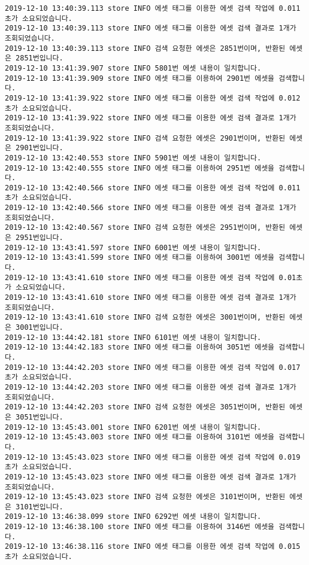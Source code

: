 \begin{Verbatim}[fontsize=\tiny, breaklines=true, breakanywhere=true]
2019-12-10 13:40:39.113 store INFO 에셋 태그를 이용한 에셋 검색 작업에 0.011초가 소요되었습니다.
2019-12-10 13:40:39.113 store INFO 에셋 태그를 이용한 에셋 검색 결과로 1개가 조회되었습니다.
2019-12-10 13:40:39.113 store INFO 검색 요청한 에셋은 2851번이며, 반환된 에셋은 2851번입니다.
2019-12-10 13:41:39.907 store INFO 5801번 에셋 내용이 일치합니다.
2019-12-10 13:41:39.909 store INFO 에셋 태그를 이용하여 2901번 에셋을 검색합니다.
2019-12-10 13:41:39.922 store INFO 에셋 태그를 이용한 에셋 검색 작업에 0.012초가 소요되었습니다.
2019-12-10 13:41:39.922 store INFO 에셋 태그를 이용한 에셋 검색 결과로 1개가 조회되었습니다.
2019-12-10 13:41:39.922 store INFO 검색 요청한 에셋은 2901번이며, 반환된 에셋은 2901번입니다.
2019-12-10 13:42:40.553 store INFO 5901번 에셋 내용이 일치합니다.
2019-12-10 13:42:40.555 store INFO 에셋 태그를 이용하여 2951번 에셋을 검색합니다.
2019-12-10 13:42:40.566 store INFO 에셋 태그를 이용한 에셋 검색 작업에 0.011초가 소요되었습니다.
2019-12-10 13:42:40.566 store INFO 에셋 태그를 이용한 에셋 검색 결과로 1개가 조회되었습니다.
2019-12-10 13:42:40.567 store INFO 검색 요청한 에셋은 2951번이며, 반환된 에셋은 2951번입니다.
2019-12-10 13:43:41.597 store INFO 6001번 에셋 내용이 일치합니다.
2019-12-10 13:43:41.599 store INFO 에셋 태그를 이용하여 3001번 에셋을 검색합니다.
2019-12-10 13:43:41.610 store INFO 에셋 태그를 이용한 에셋 검색 작업에 0.01초가 소요되었습니다.
2019-12-10 13:43:41.610 store INFO 에셋 태그를 이용한 에셋 검색 결과로 1개가 조회되었습니다.
2019-12-10 13:43:41.610 store INFO 검색 요청한 에셋은 3001번이며, 반환된 에셋은 3001번입니다.
2019-12-10 13:44:42.181 store INFO 6101번 에셋 내용이 일치합니다.
2019-12-10 13:44:42.183 store INFO 에셋 태그를 이용하여 3051번 에셋을 검색합니다.
2019-12-10 13:44:42.203 store INFO 에셋 태그를 이용한 에셋 검색 작업에 0.017초가 소요되었습니다.
2019-12-10 13:44:42.203 store INFO 에셋 태그를 이용한 에셋 검색 결과로 1개가 조회되었습니다.
2019-12-10 13:44:42.203 store INFO 검색 요청한 에셋은 3051번이며, 반환된 에셋은 3051번입니다.
2019-12-10 13:45:43.001 store INFO 6201번 에셋 내용이 일치합니다.
2019-12-10 13:45:43.003 store INFO 에셋 태그를 이용하여 3101번 에셋을 검색합니다.
2019-12-10 13:45:43.023 store INFO 에셋 태그를 이용한 에셋 검색 작업에 0.019초가 소요되었습니다.
2019-12-10 13:45:43.023 store INFO 에셋 태그를 이용한 에셋 검색 결과로 1개가 조회되었습니다.
2019-12-10 13:45:43.023 store INFO 검색 요청한 에셋은 3101번이며, 반환된 에셋은 3101번입니다.
2019-12-10 13:46:38.099 store INFO 6292번 에셋 내용이 일치합니다.
2019-12-10 13:46:38.100 store INFO 에셋 태그를 이용하여 3146번 에셋을 검색합니다.
2019-12-10 13:46:38.116 store INFO 에셋 태그를 이용한 에셋 검색 작업에 0.015초가 소요되었습니다.

\end{Verbatim}
